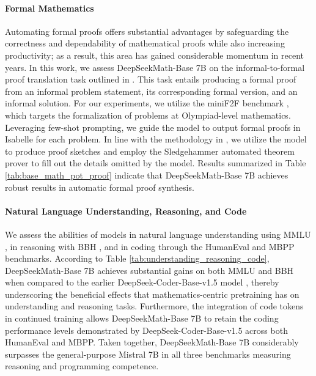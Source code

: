 \begin{itemize}[topsep=0pt]
\paragraph{Formal Mathematics}

Automating formal proofs offers substantial advantages by safeguarding the correctness and dependability of mathematical proofs while also increasing productivity; as a result, this area has gained considerable momentum in recent years. In this work, we assess DeepSeekMath-Base 7B on the informal-to-formal proof translation task outlined in \citep{dsp_proof}. This task entails producing a formal proof from an informal problem statement, its corresponding formal version, and an informal solution. For our experiments, we utilize the miniF2F benchmark \citep{minif2f}, which targets the formalization of problems at Olympiad-level mathematics. Leveraging few-shot prompting, we guide the model to output formal proofs in Isabelle for each problem. In line with the methodology in \cite{dsp_proof}, we utilize the model to produce proof sketches and employ the Sledgehammer automated theorem prover \citep{sledgehammer} to fill out the details omitted by the model. Results summarized in Table \ref{tab:base_math_pot_proof} indicate that DeepSeekMath-Base 7B achieves robust results in automatic formal proof synthesis.

\paragraph{Natural Language Understanding, Reasoning, and Code}

We assess the abilities of models in natural language understanding using MMLU \citep{mmlu}, in reasoning with BBH \citep{bbh}, and in coding through the HumanEval \citep{codex} and MBPP \citep{mbpp} benchmarks. According to Table \ref{tab:understanding_reasoning_code}, DeepSeekMath-Base 7B achieves substantial gains on both MMLU and BBH when compared to the earlier DeepSeek-Coder-Base-v1.5 model \citep{deepseek-coder}, thereby underscoring the beneficial effects that mathematics-centric pretraining has on understanding and reasoning tasks. Furthermore, the integration of code tokens in continued training allows DeepSeekMath-Base 7B to retain the coding performance levels demonstrated by DeepSeek-Coder-Base-v1.5 across both HumanEval and MBPP. Taken together, DeepSeekMath-Base 7B considerably surpasses the general-purpose Mistral 7B \citep{mistral} in all three benchmarks measuring reasoning and programming competence.


\end{itemize}
